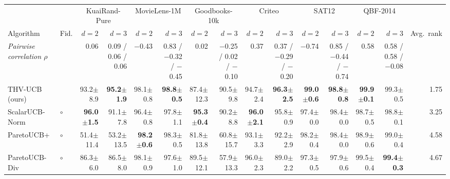 \begin{tabular}{llrrrrrrrrrrrrr}
\toprule
 & & \multicolumn{2}{c}{KuaiRand-Pure} & \multicolumn{2}{c}{MovieLens-1M} & \multicolumn{2}{c}{Goodbooks-10k} & \multicolumn{2}{c}{Criteo} & \multicolumn{2}{c}{SAT12} & \multicolumn{2}{c}{QBF-2014} & \\
\cmidrule(lr){3-4}\cmidrule(lr){5-6}\cmidrule(lr){7-8}\cmidrule(lr){9-10}\cmidrule(lr){11-12}\cmidrule(lr){13-14}
Algorithm & Fid. & $d=2$ & $d=3$ & $d=2$ & $d=3$ & $d=2$ & $d=3$ & $d=2$ & $d=3$ & $d=2$ & $d=3$ & $d=2$ & $d=3$ & Avg.\ rank\\
\midrule
\textit{Pairwise correlation $\rho$} & & {\scriptsize 0.06} & {\scriptsize 0.09 / 0.06 / 0.06} & {\scriptsize $-$0.43} & {\scriptsize 0.83 / $-$0.32 / $-$0.45} & {\scriptsize 0.02} & {\scriptsize $-$0.25 / 0.02 / $-$0.10} & {\scriptsize 0.37} & {\scriptsize 0.37 / $-$0.29 / $-$0.20} & {\scriptsize $-$0.74} & {\scriptsize 0.85 / $-$0.44 / $-$0.74} & {\scriptsize 0.58} & {\scriptsize 0.58 / 0.58 / $-$0.08} & \\
\midrule
THV-UCB (ours) &  & 93.2{\scriptsize$\pm$8.9} & \textbf{95.2{\scriptsize$\pm$1.9}} & 98.1{\scriptsize$\pm$0.8} & \textbf{98.8{\scriptsize$\pm$0.5}} & 87.4{\scriptsize$\pm$12.3} & 90.5{\scriptsize$\pm$9.8} & 94.7{\scriptsize$\pm$2.4} & \textbf{96.3{\scriptsize$\pm$2.5}} & \textbf{99.0{\scriptsize$\pm$0.6}} & \textbf{98.8{\scriptsize$\pm$0.8}} & \textbf{99.9{\scriptsize$\pm$0.1}} & 99.3{\scriptsize$\pm$0.5} & 1.75\\
\midrule
ScalarUCB-Norm & $\circ$ & \textbf{96.0{\scriptsize$\pm$1.5}} & 91.1{\scriptsize$\pm$7.8} & 96.4{\scriptsize$\pm$0.8} & 97.8{\scriptsize$\pm$1.1} & \textbf{95.3{\scriptsize$\pm$0.4}} & 90.2{\scriptsize$\pm$8.8} & \textbf{96.0{\scriptsize$\pm$2.1}} & 95.8{\scriptsize$\pm$0.9} & 97.4{\scriptsize$\pm$0.0} & 98.4{\scriptsize$\pm$0.0} & 98.7{\scriptsize$\pm$0.5} & 98.8{\scriptsize$\pm$0.1} & 3.25\\
ParetoUCB+ & $\circ$ & 51.4{\scriptsize$\pm$11.4} & 53.2{\scriptsize$\pm$13.5} & \textbf{98.2{\scriptsize$\pm$0.6}} & 98.3{\scriptsize$\pm$0.5} & 81.8{\scriptsize$\pm$13.8} & 60.8{\scriptsize$\pm$15.7} & 93.1{\scriptsize$\pm$3.3} & 92.2{\scriptsize$\pm$2.9} & 98.2{\scriptsize$\pm$0.4} & 98.4{\scriptsize$\pm$0.0} & 98.9{\scriptsize$\pm$0.6} & 99.0{\scriptsize$\pm$0.4} & 4.58\\
ParetoUCB-Div & $\circ$ & 86.3{\scriptsize$\pm$6.0} & 86.5{\scriptsize$\pm$8.0} & 98.1{\scriptsize$\pm$0.9} & 97.6{\scriptsize$\pm$1.0} & 89.5{\scriptsize$\pm$12.1} & 57.9{\scriptsize$\pm$13.3} & 96.0{\scriptsize$\pm$2.3} & 89.0{\scriptsize$\pm$2.2} & 97.3{\scriptsize$\pm$0.5} & 97.9{\scriptsize$\pm$0.6} & 99.5{\scriptsize$\pm$0.4} & \textbf{99.4{\scriptsize$\pm$0.3}} & 4.67\\

\end{tabular}
